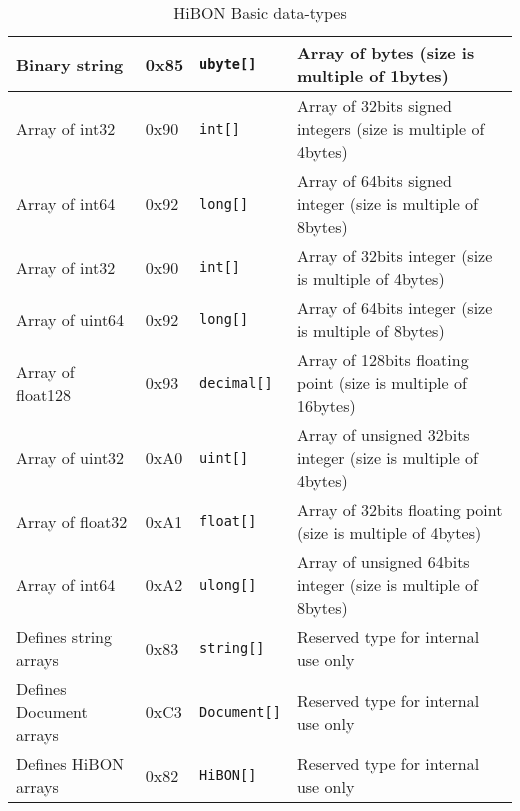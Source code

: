 \begin{table}[H]
\begin{center}
\begin{tabular}{|p{3.5cm}|l|p{1.5cm}|p{8cm}|}
      \hline
      Binary string    & 0x85 & \texttt{ubyte[]} & Array of bytes (size is multiple of 1bytes)\\
      \hline
      Array of int32   & 0x90 & \texttt{int[]} & Array of 32bits signed integers (size is multiple of 4bytes) \\
      \hline
      Array of int64   & 0x92 & \texttt{long[]} &  Array of 64bits signed integer (size is multiple of 8bytes) \\
      \hline
      Array of int32 & 0x90 & \texttt{int[]} & Array of 32bits integer (size is multiple of 4bytes) \\
      \hline
      Array of uint64 & 0x92 & \texttt{long[]} & Array of 64bits integer (size is multiple of 8bytes) \\
      \hline
      Array of float128 & 0x93 & \texttt{decimal[]}  & Array of 128bits floating point (size is multiple of 16bytes) \\
      \hline
      Array of uint32 & 0xA0 & \texttt{uint[]} & Array of unsigned 32bits integer (size is multiple of 4bytes) \\
      \hline
      Array of float32 & 0xA1 & \texttt{float[]}  & Array of 32bits floating point (size is multiple of 4bytes) \\
      \hline
      Array of int64 & 0xA2 & \texttt{ulong[]} & Array of unsigned 64bits integer (size is multiple of 8bytes) \\
      \hline
      Defines string arrays    & 0x83 & \texttt{string[]} & Reserved type for internal use only \\
      \hline
      Defines Document arrays  & 0xC3 & \texttt{Document[]} & Reserved type for internal use only \\
      \hline
      Defines HiBON arrays     & 0x82 & \texttt{HiBON[]} & Reserved type for internal use only \\
      \hline
  \end{tabular}
\end{center}
\caption{HiBON Basic data-types}
\label{tab:hibon}
\end{table}
